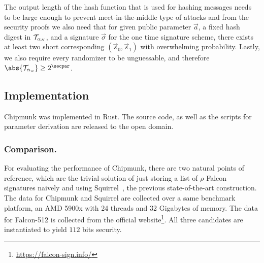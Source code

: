 The output length of the hash function that is used for hashing messages needs to be large enough to prevent meet-in-the-middle type of attacks and from the security proofs we also need that for given public parameter $\vec{a}$, a fixed hash digest in $\mathcal{T}_{\alpha_H}$, and a signature $\vec{\sigma}$ for the one time signature scheme,
there exists at least two short corresponding $(\vec{s}_0, \vec{s}_1)$ with overwhelming probability.
Lastly, we also require every randomizer to be unguessable, and therefore $\abs{\tern_{\alpha_w}} \geq 2^\secpar$.

\subsection{Implementation}
Chipmunk was implemented in Rust. The source code, as well as the scripts for parameter derivation are released to the open domain.

\subsubsection{Comparison.}\label{ss:comparison}
For evaluating the performance of Chipmunk, there are two natural points of reference, which are
the trivial solution of just storing a list of $\rho$ Falcon signatures naively and using
Squirrel~\cite{CCS:FleSimZha22}, the previous state-of-the-art construction.
The data for Chipmunk and Squirrel are collected over a same benchmark platform, an AMD 5900x with 24 threads and 32 Gigabytes of memory.
The data for Falcon-512 is collected from the official website\footnote{\url{https://falcon-sign.info/}}.
All three candidates are instantiated to yield $112$ bits security.

